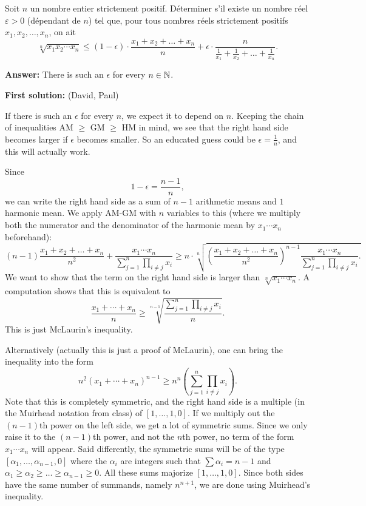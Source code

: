 Soit $n$ un nombre entier strictement positif. Déterminer s'il existe un nombre réel $\varepsilon >0$ (dépendant de $n$)
tel que, pour tous nombres réels strictement positifs $x_1,x_2,\ldots,x_n$, on ait
\[
 \sqrt[n]{x_1x_2\cdots x_n} \le (1-\epsilon) \cdot \frac{x_1+x_2+\dots + x_n}{n}+\epsilon \cdot \frac{n}{\frac{1}{x_1}+\frac{1}{x_2}+\dots+\frac{1}{x_n}}.
\]

\textbf{Answer:} There is such an $\epsilon$ for every $n\in\mathbb{N}$.

\textbf{First solution:} (David, Paul)

If there is such an $\epsilon$ for every $n$, we expect it to depend on $n$. Keeping the chain of inequalities AM $\geq$ GM $\geq$ HM in mind, we see that the right hand side becomes larger if $\epsilon$ becomes smaller. So an educated guess could be $\epsilon = \frac{1}{n}$, and this will actually work. \par
Since 
\[
1-\epsilon = \frac{n-1}{n},
\]
we can write the right hand side as a sum of $n-1$ arithmetic means and $1$ harmonic mean. We apply AM-GM with $n$ variables to this (where we multiply both the numerator and the denominator of the harmonic mean by $x_1\cdots x_n$ beforehand):
\[
(n-1)\frac{x_1+x_2+\dots + x_n}{n^2} + \frac{x_1\cdots x_n}{\sum_{j=1}^n \prod_{i\neq j} x_i} \geq n\cdot \sqrt[n]{\left(\frac{x_1+x_2+\dots + x_n}{n^2}\right)^{n-1}\frac{x_1\cdots x_n}{\sum_{j=1}^n \prod_{i\neq j} x_i}.   }
\]
We want to show that the term on the right hand side is larger than $\sqrt[n]{x_1\cdots x_n}$. A computation shows that this is equivalent to
\[
\frac{x_1+\cdots + x_n}{n} \geq \sqrt[n-1]{\frac{\sum_{j=1}^n \prod_{i\neq j} x_i}{n}}.
\]
This is just McLaurin's inequality.\par
Alternatively (actually this is just a proof of McLaurin), one can bring the inequality into the form
\[
n^2(x_1+\cdots +x_n)^{n-1} \geq n^n\left(\sum_{j=1}^n \prod_{i\neq j} x_i\right).
\]
Note that this is completely symmetric, and the right hand side is a multiple (in the Muirhead notation from class) of $[1,\ldots , 1, 0]$. If we multiply out the $(n-1)$th power on the left side, we get a lot of symmetric sums. Since we only raise it to the $(n-1)$th power, and not the $n$th power, no term of the form $x_1\cdots x_n$ will appear. Said differently, the symmetric sums will be of the type $[\alpha_1,\ldots,\alpha_{n-1},0]$ where the $\alpha_i$ are integers such that $\sum \alpha_i=n-1$ and $\alpha_1\geq \alpha_2\geq\ldots\geq \alpha_{n-1}\geq 0$. All these sums majorize $[1,\ldots,1,0]$. Since both sides have the same number of summands, namely $n^{n+1}$, we are done using Muirhead's inequality.

